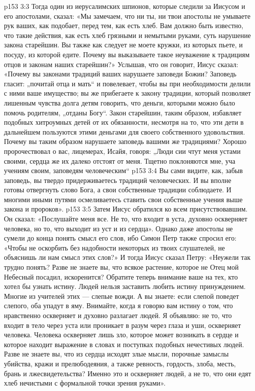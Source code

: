 \vs p153 3:3 Тогда один из иерусалимских шпионов, которые следили за Иисусом и его апостолами, сказал: «Мы замечаем, что ни ты, ни твои апостолы не умываете рук ваших, как подобает, перед тем, как есть хлеб. Вам должно быть известно, что такие действия, как есть хлеб грязными и немытыми руками, суть нарушение закона старейшин. Вы также как следует не моете кружки, из которых пьете, и посуду, из которой едите. Почему вы выказываете такое неуважение к традициям отцов и законам наших старейшин?» Услышав, что он говорит, Иисус сказал: «Почему вы законами традиций ваших нарушаете заповеди Божии? Заповедь гласит: „почитай отца и мать“ и повелевает, чтобы вы при необходимости делили с ними ваше имущество; вы же прибегаете к закону традиции, который позволяет лишенным чувства долга детям говорить, что деньги, которыми можно было помочь родителям, „отданы Богу“. Закон старейшин, таким образом, избавляет подобных хитроумных детей от их обязанности, несмотря на то, что эти дети в дальнейшем пользуются этими деньгами для своего собственного удовольствия. Почему вы таким образом нарушаете заповедь вашими же традициями? Хорошо пророчествовал о вас, лицемерах, Исайя, говоря: „Люди сии чтут меня устами своими, сердца же их далеко отстоят от меня. Тщетно поклоняются мне, уча учениям своим, заповедям человеческим“
\vs p153 3:4 Вы сами видите, как, забыв заповедь, вы твердо придерживаетесь традиций человеческих. И вы вполне готовы отвергнуть слово Бога, а свои собственные традиции соблюдаете. И многими иными путями осмеливаетесь ставить свои собственные учения выше закона и пророков».
\vs p153 3:5 Затем Иисус обратился ко всем присутствовавшим. Он сказал: «Послушайте меня все. Не то, что входит в уста, духовно оскверняет человека, но то, что выходит из уст и из сердца». Однако даже апостолы не сумели до конца понять смысл его слов, ибо Симон Петр также спросил его: «Чтобы не оскорбить без надобности некоторых из твоих слушателей, не объяснишь ли нам смысл этих слов?» И тогда Иисус сказал Петру: «Неужели так трудно понять? Разве не знаете вы, что всякое растение, которое не Отец мой Небесный посадил, искоренится? Обратите теперь внимание ваше на тех, кто хотел бы узнать истину. Людей нельзя заставить любить истину принуждением. Многие из учителей этих --- слепые вожди. А вы знаете: если слепой поведет слепого, оба упадут в яму. Внимайте, когда я говорю вам истину о том, что нравственно оскверняет и духовно разлагает людей. Я объявляю: не то, что входит в тело через уста или проникает в разум через глаза и уши, оскверняет человека. Человека оскверняет лишь зло, которое может возникать в сердце и которое находит выражение в словах и поступках подобных нечестивых людей. Разве не знаете вы, что из сердца исходят злые мысли, порочные замыслы убийства, кражи и прелюбодеяния, а также ревность, гордость, злоба, месть, брань и лжесвидетельства? Именно это и оскверняет людей, а не то, что они едят хлеб нечистыми с формальной точки зрения руками».
